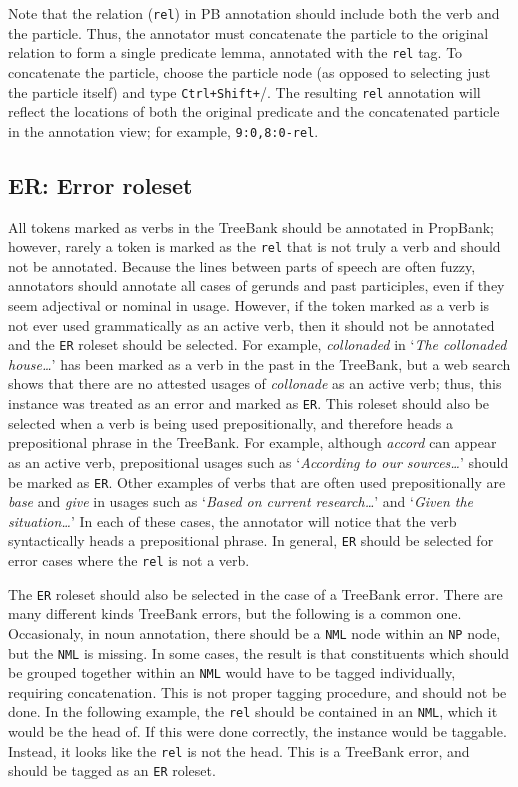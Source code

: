 \documentclass[11pt]{report}
\newcommand{\ctrlshift}{{\tt Ctrl+Shift+}}
\begin{document}
Note that the relation (\texttt{rel}) in PB annotation should include both the verb and the particle. Thus, the annotator must concatenate the particle to the original relation to form a single predicate lemma, annotated with the \texttt{rel} tag.  To concatenate the particle, choose the particle node (as opposed to selecting just the particle itself) and type \ctrlshift /.  The resulting \texttt{rel} annotation will reflect the locations of both the original predicate and the concatenated particle in the annotation view; for example, {\tt 9:0,8:0-rel}. 

\subsection{ER: Error roleset}
All tokens marked as verbs in the TreeBank should be annotated in PropBank; however, rarely a token is marked as the \texttt{rel} that is not truly a verb and should not be annotated.  Because the lines between parts of speech are often fuzzy, annotators should annotate all cases of gerunds and past participles, even if they seem adjectival or nominal in usage.  However, if the token marked as a verb is not ever used grammatically as an active verb, then it should not be annotated and the \texttt{ER} roleset should be selected.  For example, \textit{collonaded} in `\textit{The collonaded house\ldots}' has been marked as a verb in the past in the TreeBank, but a web search shows that there are no attested usages of \textit{collonade} as an active verb; thus, this instance was treated as an error and marked as \texttt{ER}.  This roleset should also be selected when a verb is being used prepositionally, and therefore heads a prepositional phrase in the TreeBank.  For example, although \textit{accord} can appear as an active verb, prepositional usages such as `\textit{According to our sources\ldots}' should be marked as \texttt{ER}.  Other examples of verbs that are often used prepositionally are \textit{base} and \textit{give} in usages such as `\textit{Based on current research\ldots}' and `\textit{Given the situation\ldots}'  In each of these cases, the annotator will notice that the verb syntactically heads a prepositional phrase.  In general, \texttt{ER} should be selected for error cases where the \texttt{rel} is not a verb. 

The \texttt{ER} roleset should also be selected in the case of a TreeBank error. There are many different kinds TreeBank errors, but the following is a common one. Occasionaly, in noun annotation, there should be a \texttt{NML} node within an \texttt{NP} node, but the \texttt{NML} is missing. In some cases, the result is that constituents which should be grouped together within an \texttt{NML} would have to be tagged individually, requiring concatenation. This is not proper tagging procedure, and should not be done. In the following example, the \texttt{rel} should be contained in an \texttt{NML}, which it would be the head of. If this were done correctly, the instance would be taggable. Instead, it looks like the \texttt{rel} is not the head. This is a TreeBank error, and should be tagged as an \texttt{ER} roleset.
\end{document}
